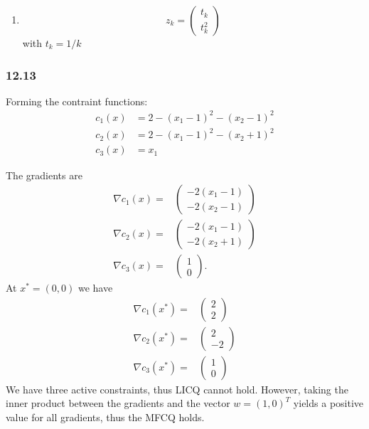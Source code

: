 \begin{enumerate}
    \item[(d)]
          \[
              z_k = \begin{pmatrix}
                  t_k \\
                  t_k^2
              \end{pmatrix}
          \]
          with $t_k = 1 / k$
\end{enumerate}

\subsubsection{12.13}

Forming the contraint functions:
\begin{align*}
    c_1(x) & = 2 - (x_1 - 1)^2 - (x_2 - 1)^2 \\
    c_2(x) & = 2 - (x_1 - 1)^2 - (x_2 + 1)^2 \\
    c_3(x) & = x_1
\end{align*}

The gradients are
\begin{align*}
    \nabla c_1(x) = & \begin{pmatrix}
                          -2(x_1 - 1) \\
                          -2(x_2 - 1)
                      \end{pmatrix} \\
    \nabla c_2(x) = & \begin{pmatrix}
                          -2(x_1 - 1) \\
                          -2(x_2 + 1)
                      \end{pmatrix} \\
    \nabla c_3(x) = & \begin{pmatrix}
                          1 \\0
                      \end{pmatrix}.
\end{align*}
At $x^* = (0,0)$ we have
\begin{align*}
    \nabla c_1(x^*) = & \begin{pmatrix}
                            2 \\
                            2
                        \end{pmatrix} \\
    \nabla c_2(x^*) = & \begin{pmatrix}
                            2 \\
                            -2
                        \end{pmatrix} \\
    \nabla c_3(x^*) = & \begin{pmatrix}
                            1 \\0
                        \end{pmatrix}
\end{align*}
We have three active constraints, thus LICQ cannot hold.
However, taking the inner product between the gradients and the vector $w = (1, 0)^T$ yields a positive value for all gradients, thus the MFCQ holds.
